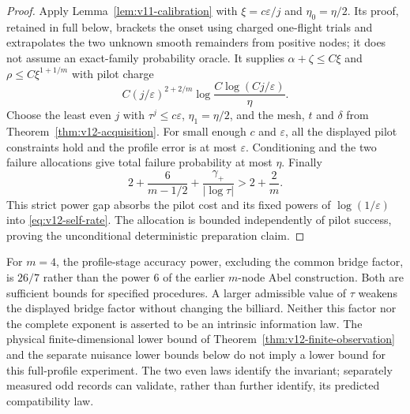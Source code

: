 \begin{proof}
Apply Lemma~\ref{lem:v11-calibration} with
$\xi=c\varepsilon/j$ and $\eta_0=\eta/2$.
Its proof, retained in full below, brackets the onset using charged
one-flight trials and extrapolates the two unknown smooth remainders
from positive nodes; it does not assume an exact-family probability
oracle. It supplies $\alpha+\zeta\le C\xi$ and
$\rho\le C\xi^{1+1/m}$ with pilot charge
\[
 C(j/\varepsilon)^{2+2/m}
               \log\frac{C\log(Cj/\varepsilon)}{\eta}.
\]
Choose the least even $j$ with $\tau^j\le c\varepsilon$,
$\eta_1=\eta/2$, and the mesh, $t$ and $\delta$ from
Theorem~\ref{thm:v12-acquisition}. For small enough $c$ and
$\varepsilon$, all the displayed pilot constraints hold and the
profile error is at most $\varepsilon$. Conditioning and the two
failure allocations give total failure probability at most $\eta$.
Finally
\[
 2+\frac6{m-1/2}+\frac{\gamma_+}{|\log\tau|}>2+\frac2m.
\]
This strict power gap absorbs the pilot cost and its fixed powers
of $\log(1/\varepsilon)$ into \eqref{eq:v12-self-rate}.
The allocation is bounded independently of pilot success, proving
the unconditional deterministic preparation claim.
\end{proof}

For $m=4$, the profile-stage accuracy power, excluding the common
bridge factor, is $26/7$ rather than the power $6$ of the earlier
$m$-node Abel construction. Both are sufficient bounds for specified
procedures. A larger admissible value of $\tau$ weakens the displayed
bridge factor without changing the billiard. Neither this factor nor
the complete exponent is asserted to be an intrinsic information law.
The physical finite-dimensional lower bound of
Theorem~\ref{thm:v12-finite-observation} and the separate nuisance
lower bounds below do not imply a lower bound for this full-profile
experiment. The two even laws identify the invariant; separately
measured odd records can validate, rather than further identify, its
predicted compatibility law.
